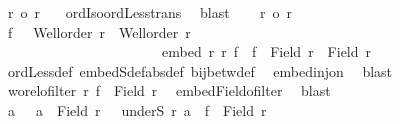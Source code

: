 \begin{isabellebody}
\ {\isachardoublequoteopen}r{\isacharprime}{\kern0pt}\ {\isacharless}{\kern0pt}o\ r{\isachardoublequoteclose}\ \isamarkupfalse%
\ {\isacharasterisk}{\kern0pt}{\isacharasterisk}{\kern0pt}\ ordIso{\isacharunderscore}{\kern0pt}ordLess{\isacharunderscore}{\kern0pt}trans\ \isamarkupfalse%
\ blast\isanewline
{}\isamarkupfalse%
\isanewline
\ \ \isamarkupfalse%
\ {\isachardoublequoteopen}r{\isacharprime}{\kern0pt}\ {\isacharless}{\kern0pt}o\ r{\isachardoublequoteclose}\isanewline
\ \ \isamarkupfalse%
\ \isamarkupfalse%
\ f\ \ {}{\isacharcolon}{\kern0pt}\ {\isachardoublequoteopen}Well{\isacharunderscore}{\kern0pt}order\ r\ {\isasymand}\ Well{\isacharunderscore}{\kern0pt}order\ r{\isacharprime}{\kern0pt}{\isachardoublequoteclose}\ \isanewline
\ \ \ \ \ \ \ \ \ \ \ \ \ \ \ \ \ \ \ \ \ \ {}{\isacharcolon}{\kern0pt}\ {\isachardoublequoteopen}embed\ r{\isacharprime}{\kern0pt}\ r\ f\ {\isasymand}\ f\ {\isacharbackquote}{\kern0pt}\ {\isacharparenleft}{\kern0pt}Field\ r{\isacharprime}{\kern0pt}{\isacharparenright}{\kern0pt}\ {\isasymnoteq}\ Field\ r{\isachardoublequoteclose}\isanewline
\ \ \isamarkupfalse%
\ ordLess{\isacharunderscore}{\kern0pt}def\ embedS{\isacharunderscore}{\kern0pt}def{\isacharbrackleft}{\kern0pt}abs{\isacharunderscore}{\kern0pt}def{\isacharbrackright}{\kern0pt}\ bij{\isacharunderscore}{\kern0pt}betw{\isacharunderscore}{\kern0pt}def\ \isamarkupfalse%
\ embed{\isacharunderscore}{\kern0pt}inj{\isacharunderscore}{\kern0pt}on\ \isamarkupfalse%
\ blast\isanewline
\ \ \isamarkupfalse%
\ {\isachardoublequoteopen}wo{\isacharunderscore}{\kern0pt}rel{\isachardot}{\kern0pt}ofilter\ r\ {\isacharparenleft}{\kern0pt}f\ {\isacharbackquote}{\kern0pt}\ {\isacharparenleft}{\kern0pt}Field\ r{\isacharprime}{\kern0pt}{\isacharparenright}{\kern0pt}{\isacharparenright}{\kern0pt}{\isachardoublequoteclose}\ \isamarkupfalse%
\ embed{\isacharunderscore}{\kern0pt}Field{\isacharunderscore}{\kern0pt}ofilter\ \isamarkupfalse%
\ blast\isanewline
\ \ \isamarkupfalse%
\ \isamarkupfalse%
\ a\ \ {}{\isacharcolon}{\kern0pt}\ {\isachardoublequoteopen}a\ {\isasymin}\ Field\ r{\isachardoublequoteclose}\ \ {}{\isacharcolon}{\kern0pt}\ {\isachardoublequoteopen}underS\ r\ a\ {\isacharequal}{\kern0pt}\ f\ {\isacharbackquote}{\kern0pt}\ {\isacharparenleft}{\kern0pt}Field\ r{\isacharprime}{\kern0pt}{\isacharparenright}{\kern0pt}{\isachardoublequoteclose}\isanewline

\end{isabellebody}
